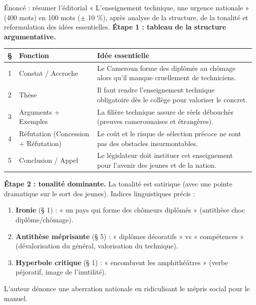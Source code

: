 \documentclass[11pt]{article}
\newcommand{\cle}[1]{{\popxbold\color{popdark}#1}}
\begin{document}
\begin{exoresolu}
Énoncé : résumer l'éditorial « L'enseignement technique, une urgence nationale » (400 mots) en 100 mots ($\pm$ 10 \%), après analyse de la structure, de la tonalité et reformulation des idées essentielles.
\tcblower
\textbf{Étape 1 : tableau de la structure argumentative.}

\begin{center}
\begin{tabularx}{\linewidth}{|c|l|X|}\hline
\rowcolor{popblueL} \textbf{§} & \textbf{Fonction} & \textbf{Idée essentielle} \\ \hline
1 & Constat / Accroche & Le Cameroun forme des diplômés au chômage alors qu'il manque cruellement de techniciens. \\ \hline
2 & Thèse & Il faut rendre l'enseignement technique obligatoire dès le collège pour valoriser le concret. \\ \hline
3 & Arguments + Exemples & La filière technique assure de réels débouchés (preuves camerounaises et étrangères). \\ \hline
4 & Réfutation (Concession + Réfutation) & Le coût et le risque de sélection précoce ne sont pas des obstacles insurmontables. \\ \hline
5 & Conclusion / Appel & Le législateur doit instituer cet enseignement pour l'avenir des jeunes et de la nation. \\ \hline
\end{tabularx}
\end{center}

\textbf{Étape 2 : tonalité dominante.} La tonalité est \cle{satirique} (avec une pointe dramatique sur le sort des jeunes). Indices linguistiques précis :
\begin{enumerate}
\item \textbf{Ironie} (§ 1) : « un pays qui forme des chômeurs diplômés » (antithèse choc diplôme/chômage).
\item \textbf{Antithèse méprisante} (§ 5) : « diplômes décoratifs » vs « compétences » (dévalorisation du général, valorisation du technique).
\item \textbf{Hyperbole critique} (§ 1) : « encombrent les amphithéâtres » (verbe péjoratif, image de l'inutilité).
\end{enumerate}
L'auteur dénonce une aberration nationale en ridiculisant le mépris social pour le manuel.


\end{exoresolu}
\end{document}
